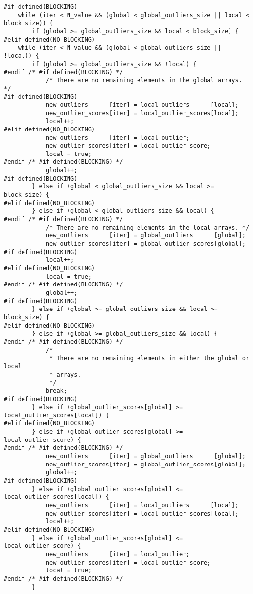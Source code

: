 \begin{lstlisting}
#if defined(BLOCKING)
    while (iter < N_value && (global < global_outliers_size || local < block_size)) {
        if (global >= global_outliers_size && local < block_size) {
#elif defined(NO_BLOCKING)
    while (iter < N_value && (global < global_outliers_size || !local)) {
        if (global >= global_outliers_size && !local) {
#endif /* #if defined(BLOCKING) */
            /* There are no remaining elements in the global arrays. */
#if defined(BLOCKING)
            new_outliers      [iter] = local_outliers      [local];
            new_outlier_scores[iter] = local_outlier_scores[local];
            local++;
#elif defined(NO_BLOCKING)
            new_outliers      [iter] = local_outlier;
            new_outlier_scores[iter] = local_outlier_score;
            local = true;
#endif /* #if defined(BLOCKING) */
            global++;
#if defined(BLOCKING)
        } else if (global < global_outliers_size && local >= block_size) {
#elif defined(NO_BLOCKING)
        } else if (global < global_outliers_size && local) {
#endif /* #if defined(BLOCKING) */
            /* There are no remaining elements in the local arrays. */
            new_outliers      [iter] = global_outliers      [global];
            new_outlier_scores[iter] = global_outlier_scores[global];
#if defined(BLOCKING)
            local++;
#elif defined(NO_BLOCKING)
            local = true;
#endif /* #if defined(BLOCKING) */
            global++;
#if defined(BLOCKING)
        } else if (global >= global_outliers_size && local >= block_size) {
#elif defined(NO_BLOCKING)
        } else if (global >= global_outliers_size && local) {
#endif /* #if defined(BLOCKING) */
            /*
             * There are no remaining elements in either the global or local 
             * arrays.
             */
            break;
#if defined(BLOCKING)
        } else if (global_outlier_scores[global] >= local_outlier_scores[local]) {
#elif defined(NO_BLOCKING)
        } else if (global_outlier_scores[global] >= local_outlier_score) {
#endif /* #if defined(BLOCKING) */
            new_outliers      [iter] = global_outliers      [global];
            new_outlier_scores[iter] = global_outlier_scores[global];
            global++;
#if defined(BLOCKING)
        } else if (global_outlier_scores[global] <= local_outlier_scores[local]) {
            new_outliers      [iter] = local_outliers      [local];
            new_outlier_scores[iter] = local_outlier_scores[local];
            local++;
#elif defined(NO_BLOCKING)
        } else if (global_outlier_scores[global] <= local_outlier_score) {
            new_outliers      [iter] = local_outlier;
            new_outlier_scores[iter] = local_outlier_score;
            local = true;
#endif /* #if defined(BLOCKING) */
        }
        

\end{lstlisting}
